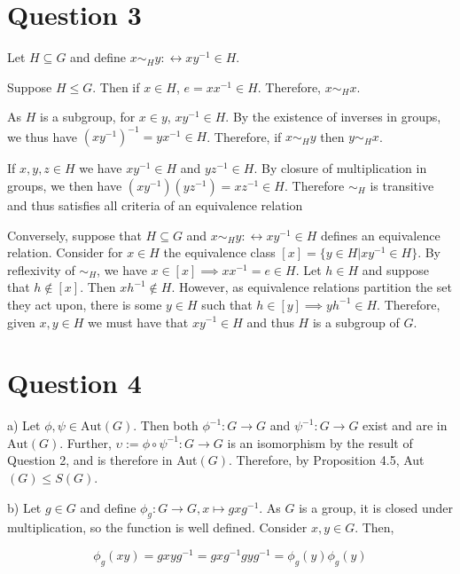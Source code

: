 \documentclass{article}
\begin{document}
\section*{Question 3}

Let $H \subseteq G$ and define $x \sim_H y : \leftrightarrow xy^{-1} \in H$.

\hfill \break
Suppose $H \leq G$. Then if $x \in H$, $e = xx^{-1} \in H$. Therefore, $x \sim_H x$.

\hfill \break
As $H$ is a subgroup, for $x \in y$, $xy^{-1} \in H$. By the existence of inverses in groups, we thus have $(xy^{-1})^{-1} = yx^{-1} \in H$. Therefore, if
$x \sim_H y$ then $y \sim_H x$.

\hfill \break
If $x, y, z \in H$ we have $xy^{-1} \in H$ and $yz^{-1} \in H$. By closure of multiplication in groups, we then have
$(xy^{-1})(yz^{-1}) = xz^{-1} \in H$. Therefore $\sim_H$ is transitive and thus satisfies all criteria of an equivalence relation

\hfill \break
Conversely, suppose that $H \subseteq G$ and $x \sim_H y : \leftrightarrow xy^{-1} \in H$ defines an equivalence relation. Consider for $x \in H$ the equivalence class
$[x] = \{y \in H | xy^{-1} \in H\}$. By reflexivity of $\sim_H$, we have $x \in [x] \implies xx^{-1} = e \in H$. Let $h \in H$ and suppose that $h \notin [x]$. Then
$xh^{-1} \notin H$. However, as equivalence relations partition the set they act upon, there is some $y \in H$ such that $h \in [y] \implies yh^{-1} \in H$. Therefore,
given $x, y \in H$ we must have that $xy^{-1} \in H$ and thus $H$ is a subgroup of $G$.

\section*{Question 4}

a) Let $\phi, \psi \in \text{Aut}(G)$. Then both $\phi^{-1}: G \rightarrow G$ and $\psi^{-1}: G \rightarrow G$ exist and are in $\text{Aut}(G)$. Further,
$\upsilon := \phi \circ \psi^{-1}: G \rightarrow G$ is an isomorphism by the result of Question 2, and is therefore in Aut$(G)$. Therefore, by Proposition 4.5, 
Aut$(G) \leq S(G)$.

\hfill \break
b) Let $g \in G$ and define $\phi_g: G \rightarrow G, x \mapsto gxg^{-1}$. As $G$ is a group, it is closed under multiplication, so the function is
well defined. Consider $x, y \in G$. Then,

\begin{equation*}
    \phi_g(xy) = gxyg^{-1} = gxg^{-1}gyg^{-1} =\phi_g(y)\phi_g(y)
\end{equation*}
\end{document}
